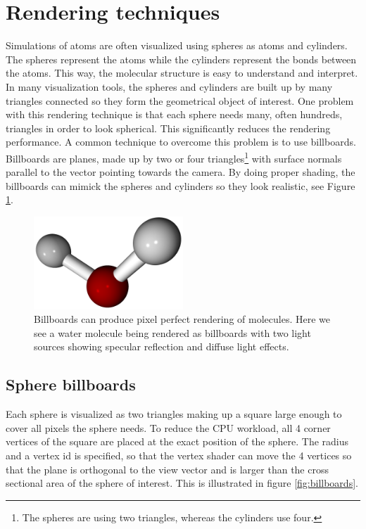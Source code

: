 \documentclass[aps,pre,twocolumn,letterpaper,floatfix]{revtex4}
\begin{document}
\section{Rendering techniques}
Simulations of atoms are often visualized using spheres as atoms and cylinders. The spheres represent the atoms while the cylinders represent the bonds between the atoms. This way, the molecular structure is easy to understand and interpret. In many visualization tools, the spheres and cylinders are built up by many triangles connected so they form the geometrical object of interest. One problem with this rendering technique is that each sphere needs many, often hundreds, triangles in order to look spherical. This significantly reduces the rendering performance. A common technique to overcome this problem is to use billboards. Billboards are planes, made up by two or four triangles\footnote{The spheres are using two triangles, whereas the cylinders use four.} with surface normals parallel to the vector pointing towards the camera. By doing proper shading, the billboards can mimick the spheres and cylinders so they look realistic, see Figure \ref{fig:final_billboards}.

\begin{figure}
	\centering
	\includegraphics[width=0.5\textwidth]{final_billboard.png}
	\caption{Billboards can produce pixel perfect rendering of molecules. Here we see a water molecule being rendered as billboards with two light sources showing specular reflection and diffuse light effects. }
	\label{fig:final_billboards}
\end{figure}

\subsection{Sphere billboards}
Each sphere is visualized as two triangles making up a square large enough to cover all pixels the sphere needs. To reduce the CPU workload, all 4 corner vertices of the square are placed at the exact position of the sphere. The radius and a vertex id is specified, so that the vertex shader can move the 4 vertices so that the plane is orthogonal to the view vector and is larger than the cross sectional area of the sphere of interest. This is illustrated in figure \ref{fig:billboards}.
\end{document}
